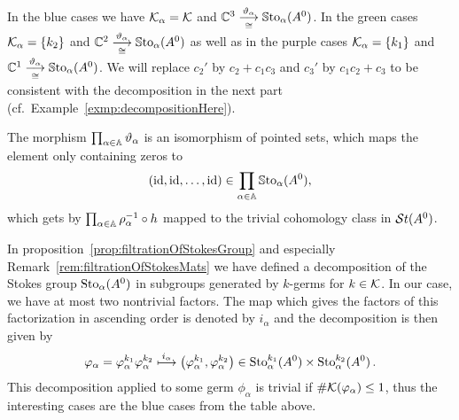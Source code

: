 In the \textcolor{blue!75!black}{blue} cases we have $\mathcal{K}_\alpha=\mathcal{K}$ and
$\mathbb{C}^3\overset{\vartheta_\alpha}{\underset{\cong}{\longrightarrow}}\operatorname{\mathbb{S}to}_\alpha(A^0)$.
In the \textcolor{green!50!black}{green} cases $\mathcal{K}_\alpha=\{k_2\}$ and
$\mathbb{C}^2\overset{\vartheta_\alpha}{\underset{\cong}{\longrightarrow}}\operatorname{\mathbb{S}to}_\alpha(A^0)$
as well as in the \textcolor{purple!75!black}{purple} cases
$\mathcal{K}_\alpha=\{k_1\}$ and
$\mathbb{C}^1\overset{\vartheta_\alpha}{\underset{\cong}{\longrightarrow}}\operatorname{\mathbb{S}to}_\alpha(A^0)$.
We will replace $c_2'$ by $c_2+c_1c_3$ and $c_3'$ by $c_1c_2+c_3$ to be
consistent with the decomposition in the next part
(cf.\ Example~\ref{exmp:decompositionHere}).
\begin{cor}
  The morphism $\prod_{\alpha\in\mathbb{A}}\vartheta_\alpha$ is an isomorphism of
  pointed sets, which maps the element only containing zeros to
  \[
    (\operatorname{id},\operatorname{id},\dots,\operatorname{id})\in\prod_{\alpha\in\mathbb{A}}\operatorname{\mathbb{S}to}_\alpha(A^0),
  \]
  which gets by $\prod_{\alpha\in\mathbb{A}}\rho_\alpha^{-1}\circ h$ mapped to the
  trivial cohomology class in $\mathcal{S}{}t(A^0)$.
\end{cor}

In proposition~\ref{prop:filtrationOfStokesGroup} and especially
Remark~\ref{rem:filtrationOfStokesMats} we have defined a decomposition of the
Stokes group $\operatorname{Sto}_\alpha(A^0)$ in subgroups generated by $k$-germs for
$k\in\mathcal{K}$.
In our case, we have at most two nontrivial factors.
The map which gives the factors of this factorization in ascending order is
denoted by $i_\alpha$ and the decomposition is then given by
\[
  \varphi_\alpha=\varphi_\alpha^{k_1} \varphi_\alpha^{k_2}
  \overset{i_\alpha}\longmapsto
    \left(\varphi_\alpha^{k_1},\varphi_\alpha^{k_2}\right)
    \in\operatorname{Sto}_\alpha^{k_1}(A^0)\times\operatorname{Sto}_\alpha^{k_2}(A^0) \,.
\]
This decomposition applied to some germ $\phi_\alpha$ is trivial if
$\#\mathcal{K}(\varphi_\alpha)\leq1$, thus the interesting cases are the
\textcolor{blue!75!black}{blue} cases from the table above.

